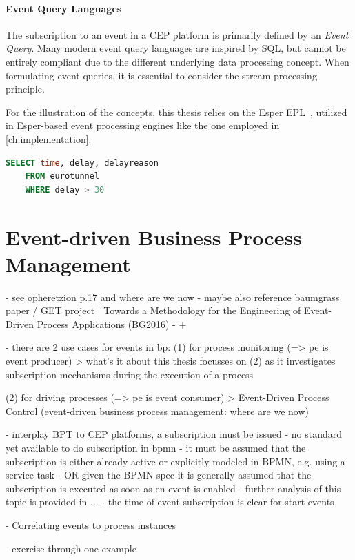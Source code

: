 
\paragraph{Event Query Languages}
The subscription to an event in a CEP platform is primarily defined by an \textit{Event Query}.
Many modern event query languages are inspired by \acs{SQL}, but cannot be entirely compliant due to the different underlying data processing concept.
When formulating event queries, it is essential to consider the stream processing principle.

For the illustration of the concepts, this thesis relies on the Esper \ac{EPL}~\cite{esperhome}, utilized in Esper-based event processing engines like the one employed in \autoref{ch:implementation}.


\begin{lstlisting}[language=sql,caption={Sample Query in Esper EPL},label=lst:epl-query-example]
	SELECT time, delay, delayreason
	FROM eurotunnel
	WHERE delay > 30
\end{lstlisting}

\section{Event-driven Business Process Management}
- see opheretzion p.17 and where are we now
- maybe also reference baumgrass paper / GET project | Towards a Methodology for the Engineering
of Event-Driven Process Applications (BG2016)
- + 

- there are 2 use cases for events in bp: 
(1) for process monitoring (=> pe is event producer)
> what's it about
this thesis focusses on (2) as it investigates subscription mechanisms during the execution of a process

(2) for driving processes (=> pe is event consumer)
> Event-Driven Process Control (event-driven business process management: where are we now)

- interplay BPT to CEP platforms, a subscription must be issued
- no standard yet available to do subscription in bpmn
- it must be assumed that the subscription is either already active or explicitly modeled in BPMN, e.g. using a service task
- OR given the BPMN spec it is generally assumed that the subscription is executed as soon as en event is enabled
- further analysis of this topic is provided in ...
- the time of event subscription is clear for start events

- Correlating events to process instances

- exercise through one example




